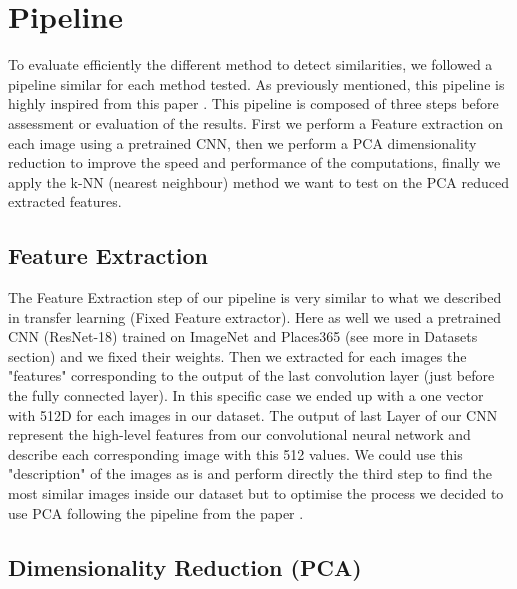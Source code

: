 \documentclass[a4paper]{article}
\begin{document}
\section{Pipeline}

To evaluate efficiently the different method to detect similarities, we followed a pipeline similar for each method tested. As previously mentioned, this pipeline is highly inspired from this paper \cite{large-scale-search}. This pipeline is composed of three steps before assessment or evaluation of the results. First we perform a Feature extraction on each image using a pretrained CNN, then we perform a PCA dimensionality reduction to improve the speed and performance of the computations, finally we apply the k-NN (nearest neighbour) method we want to test on the PCA reduced extracted features.


\subsection{Feature Extraction}

The Feature Extraction step of our pipeline is very similar to what we described in transfer learning (Fixed Feature extractor). Here as well we used a pretrained CNN (ResNet-18) trained on ImageNet and Places365 (see more in Datasets section) and we fixed their weights. Then we extracted for each images the "features" corresponding to the output of the last convolution layer (just before the fully connected layer). In this specific case we ended up with a one vector with 512D for each images in our dataset. The output of last Layer of our CNN represent the high-level features from our convolutional neural network and describe each corresponding image with this 512 values. We could use this "description" of the images as is and perform directly the third step to find the most similar images inside our dataset but to optimise the process we decided to use PCA following the pipeline from the paper \cite{large-scale-search}.  

\subsection{Dimensionality Reduction (PCA)}
\end{document}

